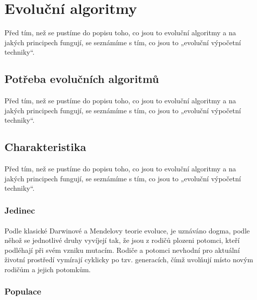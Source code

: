 \documentclass[bc,male,java,dept460]{diploma}		%
\begin{document}
\section{Evoluční algoritmy}
\paragraph*{}
Před tím, než se pustíme do popisu toho, co jsou to evoluční algoritmy a na jakých principech fungují, se seznámíme s tím, co jsou to „evoluční výpočetní techniky“.

\subsection{Potřeba evolučních algoritmů}
\paragraph*{}
Před tím, než se pustíme do popisu toho, co jsou to evoluční algoritmy a na jakých principech fungují, se seznámíme s tím, co jsou to „evoluční výpočetní techniky“.

\subsection{Charakteristika}
\paragraph*{}
Před tím, než se pustíme do popisu toho, co jsou to evoluční algoritmy a na jakých principech fungují, se seznámíme s tím, co jsou to „evoluční výpočetní techniky“.

\subsubsection{Jedinec}
\paragraph*{}
Podle klasické Darwinové a Mendelovy teorie evoluce, je uznáváno dogma, podle něhož se jednotlivé druhy vyvíjejí tak, že jsou z rodičů plozeni potomci, kteří podléhají při svém vzniku mutacím. Rodiče a potomci nevhodní pro aktuální životní prostředí vymírají cyklicky po tzv. generacích, čímž uvolňují místo novým rodičům a jejich potomkům.

\subsubsection{Populace}
\end{document}

